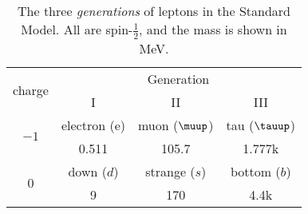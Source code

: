 \begin{table}
\begin{minipage}{\textwidth}
\begin{center}
\begin{singlespacing}

\caption[Leptons in the Standard Model]{\label{tab:leptons}The three \emph{generations} of leptons in the Standard Model. All are spin-$\frac{1}{2}$, and the mass is shown in MeV.}

\begin{tabular}{c|ccc}

\hline \hline

\multirow{2}{*}{charge} & \multicolumn{3}{c}{Generation} \\
 & I & II & III \\

\hline

\multirow{2}{*}{$-1$} & electron (e) & muon ($\muup$) & tau ($\tauup$) \\
 & 0.511 & 105.7 & 1.777k \\

\hline

\multirow{2}{*}{0} & down ($d$) & strange ($s$) & bottom ($b$) \\
 & 9 & 170 & 4.4k \\

\hline \hline

\end{tabular}

\end{singlespacing}
\end{center}
\end{minipage}
\end{table}
\vspace{20pt}